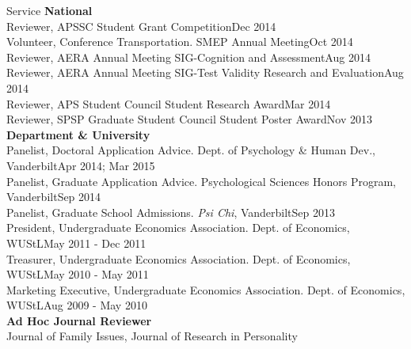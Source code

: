 \documentclass {resume}
\begin{document}
\begin{rSection}{\textrm{Service}}
{\large \textbf{National}}\\
Reviewer, APSSC Student Grant Competition\hfill{Dec 2014}\smallskip\\
Volunteer, Conference Transportation. SMEP Annual Meeting\hfill{Oct 2014}\smallskip\\
Reviewer, AERA Annual Meeting SIG-Cognition and Assessment\hfill{Aug 2014}\smallskip\\%
Reviewer, AERA Annual Meeting SIG-Test Validity Research and Evaluation\hfill{Aug 2014}\smallskip\\
Reviewer, APS Student Council Student Research Award\hfill{Mar 2014}\smallskip\\
Reviewer, SPSP Graduate Student Council Student Poster Award\hfill{Nov 2013}\medskip\\
{\large \textbf{Department \& University}}\\
Panelist, Doctoral Application Advice. Dept. of Psychology \& Human Dev., Vanderbilt\hfill {Apr 2014; Mar 2015}\smallskip\\
Panelist, Graduate Application Advice. Psychological Sciences Honors Program, Vanderbilt\hfill {Sep 2014}\smallskip\\
Panelist, Graduate School Admissions. \textit{Psi Chi}, Vanderbilt\hfill {Sep 2013}\smallskip\\
President, Undergraduate Economics Association. Dept. of Economics, WUStL\hfill  {May 2011 - Dec 2011}\smallskip\\
Treasurer, Undergraduate Economics Association. Dept. of Economics, WUStL\hfill{May 2010 - May 2011}\smallskip\\
Marketing Executive, Undergraduate Economics Association. Dept. of Economics, WUStL\hfill  {Aug 2009 - May 2010}\medskip\\
{\large \textbf{Ad Hoc Journal Reviewer}}\\
Journal of Family Issues, %
Journal of Research in Personality%
\end{rSection}
\end{document}
